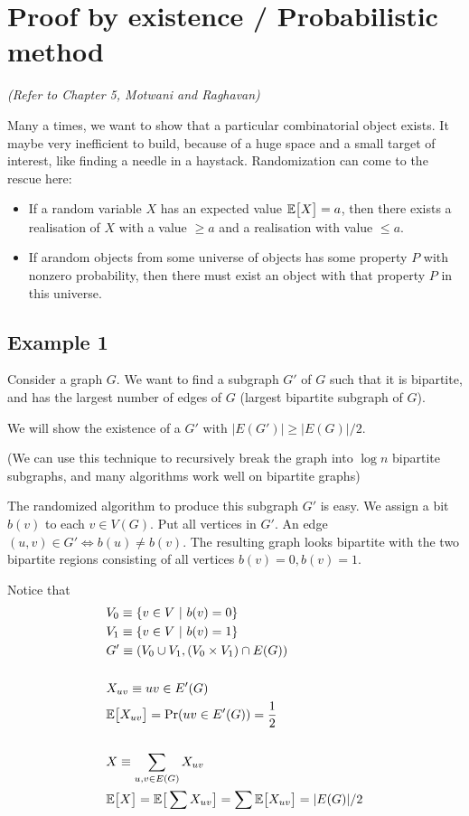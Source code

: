 \section{Proof by existence / Probabilistic method}
\textit{(Refer to Chapter 5, Motwani and Raghavan)}


Many a times, we want to show that a particular combinatorial object exists.
It maybe very inefficient to build, because of a huge space and a small
target of interest, like finding a needle in a haystack. Randomization
can come to the rescue here:

\begin{itemize}
\item If a random variable $X$ has an expected value $\mathbb{E}\big[ X \big] = a$, then there
exists a realisation of $X$ with a value $\geq a$ and a realisation with
value $\leq a$.

\item If arandom objects from some universe of objects has some property $P$
with nonzero probability, then there must exist an object with that property
$P$ in this universe.
\end{itemize}

\subsection{Example 1}
Consider a graph $G$. We want to find a subgraph $G'$ of $G$ such that it
is bipartite, and has the largest number of edges of $G$ (largest bipartite
subgraph of $G$).

We will show the existence of a $G'$ with $|E(G')| \geq |E(G)|/2$.

(We can use this technique to recursively break the graph into $\log n$
bipartite subgraphs, and many algorithms work well on bipartite graphs)

The randomized algorithm to produce this subgraph $G'$ is easy. We assign
a bit $b(v)$ to each $v \in V(G)$.  Put all vertices in $G'$. 
An edge $(u, v) \in G' \iff b(u) \neq b(v)$. The resulting graph 
looks bipartite with the two bipartite regions consisting of all vertices
$b(v) = 0, b(v) = 1$.


Notice that 
\begin{align*}
&V_0 \equiv \{ v \in V ~\vert~b(v) = 0 \}\\ 
&V_1 \equiv \{ v \in V ~\vert~b(v) = 1 \}\\ 
&G' \equiv (V_0 \cup V_1, (V_0 \times V_1) \cap E(G)) \\
\\
&X_{uv} \equiv \text{$uv \in E'(G)$} \\
&\mathbb{E}\big[ X_{uv} \big] = \Pr(uv \in E'(G)) = \frac{1}{2} \\
\\
&X \equiv \sum_{u, v \in E(G)} X_{uv} \\
&\mathbb{E}\big[ X \big] = \mathbb{E}\big[ \sum X_{uv} \big] = \sum \mathbb{E}\big[ X_{uv} \big] = |E(G)|/2
\end{align*}



